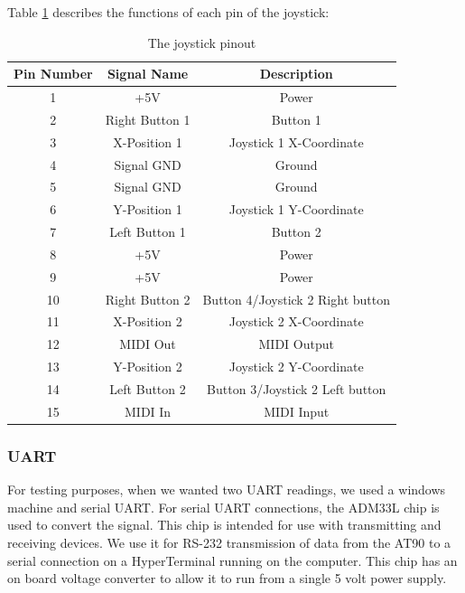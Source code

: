 Table \ref{joystickPinout} describes the functions of each pin of the joystick:
\begin{table}
\caption{The joystick pinout}
\begin{center}
\begin{tabular}{ c c c } 
  Pin Number & Signal Name & Description \\
  \hline
 1 & +5V & Power \\
 2 & Right Button 1 & Button 1 \\
 3 & X-Position 1 & Joystick 1 X-Coordinate \\
 4 & Signal GND & Ground \\
 5 & Signal GND & Ground \\
 6 & Y-Position 1 & Joystick 1 Y-Coordinate \\
 7 & Left Button 1 & Button 2 \\
 8 & +5V & Power \\
 9 & +5V & Power \\
 10 & Right Button 2 & Button 4/Joystick 2 Right button \\
 11 & X-Position 2 & Joystick 2 X-Coordinate \\
 12 & MIDI Out & MIDI Output \\
 13 & Y-Position 2 & Joystick 2 Y-Coordinate \\
 14 & Left Button 2 & Button 3/Joystick 2 Left button \\
 15 & MIDI In & MIDI Input \\
\end{tabular}
\label{joystickPinout}
\end{center}
\end{table}

\subsubsection{UART}
For testing purposes, when we wanted two UART readings, we used a windows machine and serial UART. For serial UART connections, the ADM33L chip is used to convert the signal. This chip is intended for use with transmitting and receiving devices. We use it for RS-232 transmission of data from the AT90 to a serial connection on a HyperTerminal running on the computer. This chip has an on board voltage converter to allow it to run from a single 5 volt power supply. 

